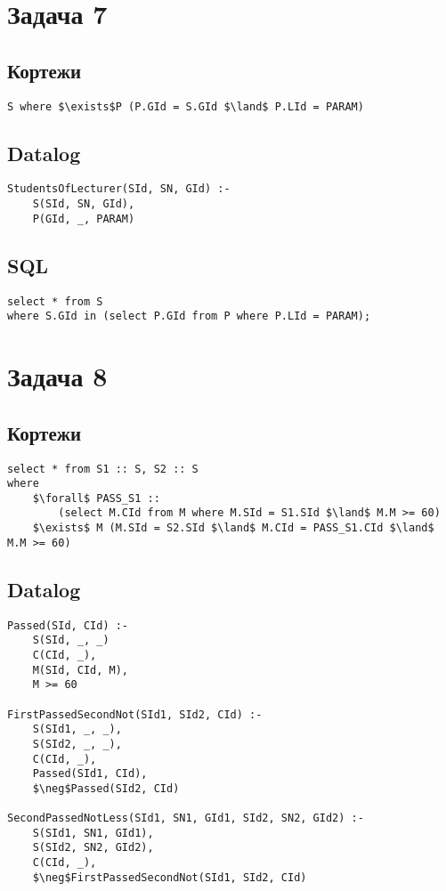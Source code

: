 \documentclass{article}
\begin{document}
\section{Задача 7}

\subsection{Кортежи}
\begin{lstlisting}[mathescape=true]
S where $\exists$P (P.GId = S.GId $\land$ P.LId = PARAM)
\end{lstlisting}

\subsection{Datalog}
\begin{lstlisting}[mathescape=true]
StudentsOfLecturer(SId, SN, GId) :-
    S(SId, SN, GId),
    P(GId, _, PARAM)
\end{lstlisting}


\subsection{SQL}
\begin{lstlisting}[mathescape=true]
select * from S
where S.GId in (select P.GId from P where P.LId = PARAM);
\end{lstlisting}



\section{Задача 8}

\subsection{Кортежи}
\begin{lstlisting}[mathescape=true]
select * from S1 :: S, S2 :: S
where
    $\forall$ PASS_S1 ::
        (select M.CId from M where M.SId = S1.SId $\land$ M.M >= 60)
    $\exists$ M (M.SId = S2.SId $\land$ M.CId = PASS_S1.CId $\land$ M.M >= 60)
\end{lstlisting}

\subsection{Datalog}
\begin{lstlisting}[mathescape=true]
Passed(SId, CId) :-
    S(SId, _, _)
    C(CId, _),
    M(SId, CId, M),
    M >= 60

FirstPassedSecondNot(SId1, SId2, CId) :-
    S(SId1, _, _),
    S(SId2, _, _),
    C(CId, _),
    Passed(SId1, CId),
    $\neg$Passed(SId2, CId)

SecondPassedNotLess(SId1, SN1, GId1, SId2, SN2, GId2) :-
    S(SId1, SN1, GId1),
    S(SId2, SN2, GId2),
    C(CId, _),
    $\neg$FirstPassedSecondNot(SId1, SId2, CId)
\end{lstlisting}
\end{document}
